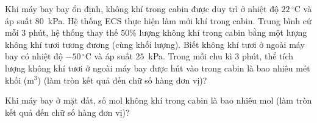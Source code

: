 \begin{ex}
\begin{center}
		\end{center}
		Khi máy bay bay ổn định, không khí trong cabin được duy trì ở nhiệt độ $22\,^\circ\text{C}$ và áp suất $80$~kPa. Hệ thống ECS thực hiện làm mới khí trong cabin. Trung bình cứ mỗi $3$ phút, hệ thống thay thế $50\%$ lượng không khí trong cabin bằng một lượng không khí tươi tương đương (cùng khối lượng). Biết không khí tươi ở ngoài máy bay có nhiệt độ $-50\,^\circ\text{C}$ và áp suất $25$~kPa. Trong mỗi chu kì $3$ phút, thể tích lượng không khí tươi ở ngoài máy bay được hút vào trong cabin là bao nhiêu mét khối ($\text{m}^3$) (làm tròn kết quả đến chữ số hàng đơn vị)?
		\par
	\end{ex}

	\begin{ex}%
		\label{BacNinh-SoGD-Lan2-III2}
		Khi máy bay ở mặt đất, số mol không khí trong cabin là bao nhiêu mol (làm tròn kết quả đến chữ số hàng đơn vị)?
		\par
	\end{ex}


